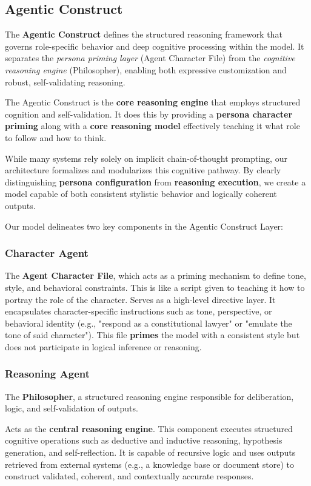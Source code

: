 \documentclass{article}
\begin{document}
\subsection{Agentic Construct}
The \textbf{Agentic Construct} defines the structured reasoning framework that governs role-specific behavior and deep cognitive processing within the model. It separates the \emph{persona priming layer} (Agent Character File) from the \emph{cognitive reasoning engine} (Philosopher), enabling both expressive customization and robust, self-validating reasoning.

The Agentic Construct is the \textbf{core reasoning engine} that employs structured cognition and self-validation. It does this by providing a \textbf{persona character priming} along with a \textbf{core reasoning model} effectively teaching it what role to follow and how to think.

While many systems rely solely on implicit chain-of-thought prompting, our architecture formalizes and modularizes this cognitive pathway. By clearly distinguishing \textbf{persona configuration} from \textbf{reasoning execution}, we create a model capable of both consistent stylistic behavior and logically coherent outputs. 

Our model delineates two key components in the Agentic Construct Layer:

\subsubsection{Character Agent}
The \textbf{Agent Character File}, which acts as a priming mechanism to define tone, style, and behavioral constraints. This is like a script given to teaching it how to portray the role of the character.
Serves as a high-level directive layer. It encapsulates character-specific instructions such as tone, perspective, or behavioral identity (e.g., "respond as a constitutional lawyer" or "emulate the tone of said character"). This file \textbf{primes} the model with a consistent style but does not participate in logical inference or reasoning.

\subsubsection{Reasoning Agent}
The \textbf{Philosopher}, a structured reasoning engine responsible for deliberation, logic, and self-validation of outputs. 

Acts as the \textbf{central reasoning engine}. This component executes structured cognitive operations such as deductive and inductive reasoning, hypothesis generation, and self-reflection. It is capable of recursive logic and uses outputs retrieved from external systems (e.g., a knowledge base or document store) to construct validated, coherent, and contextually accurate responses. 
\end{document}
